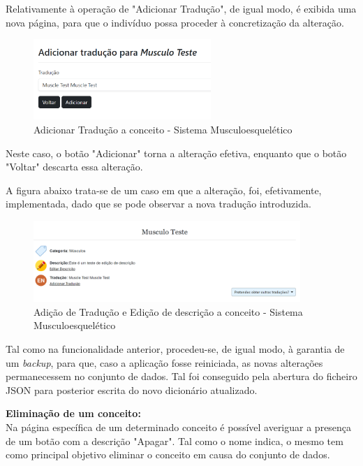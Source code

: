 Relativamente à operação de "Adicionar Tradução", de igual modo, é exibida uma nova página, para que o indivíduo possa proceder à concretização da alteração.

\begin{figure}[H]
    \centering
    \centering
    \includegraphics[width=0.6\textwidth]{Images/termo_add_trad.png}
    \caption{Adicionar Tradução a conceito - Sistema Musculoesquelético}
    \label{fig:dic-traduc1}
\end{figure}

Neste caso, o botão "Adicionar" torna a alteração efetiva, enquanto que o botão "Voltar" descarta essa alteração.

A figura abaixo trata-se de um caso em que a alteração, foi, efetivamente, implementada, dado que se pode observar a nova tradução introduzida.

\begin{figure}[H]
    \centering
    \centering
    \includegraphics[width=0.9\textwidth]{Images/termo_desc_trad_editada.png}
    \caption{Adição de Tradução e Edição de descrição a conceito - Sistema Musculoesquelético}
    \label{fig:dic-traduc1}
\end{figure}

Tal como na funcionalidade anterior, procedeu-se, de igual modo, à garantia de um \textit{backup}, para que, caso a aplicação fosse reiniciada, as novas alterações permanecessem no conjunto de dados. Tal foi conseguido pela abertura do ficheiro JSON para posterior escrita do novo dicionário atualizado.


\textbf{Eliminação de um conceito:}\\

Na página específica de um determinado conceito é possível averiguar a presença de um botão com a descrição "Apagar". Tal como o nome indica, o mesmo tem como principal objetivo eliminar o conceito em causa do conjunto de dados.

